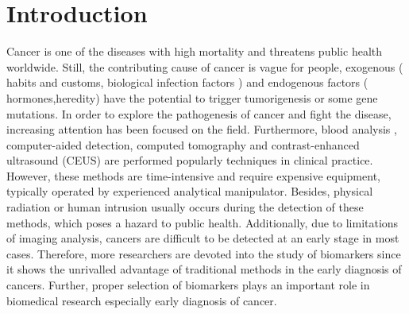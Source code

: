 \documentclass[twoside,twocolumn,9pt]{article}
\begin{document}






\section{Introduction}
Cancer is one of the diseases with high mortality and threatens public health worldwide\cite{siegel2019cancer}. Still, the contributing cause of cancer is vague for people, exogenous ( habits and customs\cite{nascentes2019social,tian2019long,kaiser2019evolving}, biological infection factors\cite{ISI:000393734100009,liu2019cerna,anampa2020human} )  and endogenous factors ( hormones\cite{nagashima2019genome,ando2019obesity},heredity\cite{wang2019statistical,roberts2019role}) have the potential to trigger tumorigenesis or some gene mutations. In order to explore the pathogenesis of cancer and  fight the disease,  increasing attention has been focused on the field. Furthermore, blood analysis , computer-aided detection, computed tomography and contrast-enhanced ultrasound (CEUS) are performed  popularly techniques in clinical practice\cite{bach2012benefits,pickhardt2011colorectal,lee2019contrast,hewitson2007screening}. However, these methods are time-intensive and require expensive equipment, typically operated by experienced analytical manipulator. Besides, physical radiation or human intrusion usually occurs during the detection of these methods, which poses a hazard to public health. Additionally,  due to limitations of imaging analysis, cancers are difficult to be detected at an early stage in most cases. Therefore, more researchers are devoted into the study of biomarkers since it shows the unrivalled advantage of traditional methods in the early diagnosis of cancers\cite{schwarzenbach2011cell,reis2010alterations}. Further, proper selection of biomarkers plays an important role in biomedical research especially early diagnosis of cancer.
\end{document}
